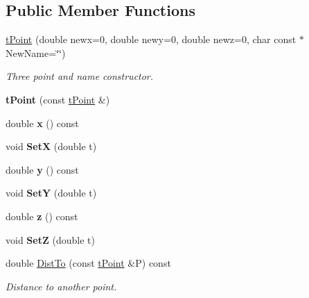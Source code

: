 \subsection*{Public Member Functions}
\begin{DoxyCompactItemize}
\item 
\mbox{\label{classtPoint_a0f7b95c63108ff1996f993f76208e4ee}} 
\hyperlink{classtPoint_a0f7b95c63108ff1996f993f76208e4ee}{t\+Point} (double newx=0, double newy=0, double newz=0, char const $\ast$New\+Name=\char`\"{}\char`\"{})
\begin{DoxyCompactList}\small\item\em Three point and name constructor. \end{DoxyCompactList}\item 
\mbox{\label{classtPoint_acd4d6c37b06415e10f037c29eeeb35d2}} 
{\bfseries t\+Point} (const \hyperlink{classtPoint}{t\+Point} \&)
\item 
\mbox{\label{classtPoint_adfae7cc9253854321270b51acedcbc4d}} 
double {\bfseries x} () const
\item 
\mbox{\label{classtPoint_ae7163ff0afe728da1be12f25844647e1}} 
void {\bfseries SetX} (double t)
\item 
\mbox{\label{classtPoint_a3386f8a21f2f962327ee32b2f77f52ee}} 
double {\bfseries y} () const
\item 
\mbox{\label{classtPoint_ad9fb0cb6d30b24d7478a1d585fe4a491}} 
void {\bfseries SetY} (double t)
\item 
\mbox{\label{classtPoint_a14ad204b83379ad64b0c8ad6af6c4eab}} 
double {\bfseries z} () const
\item 
\mbox{\label{classtPoint_a8da9a00e6d00624721b3dd9bb7a0df79}} 
void {\bfseries SetZ} (double t)
\item 
\mbox{\label{classtPoint_ae712421b8ca24bf96a5516acaf773624}} 
double \hyperlink{classtPoint_ae712421b8ca24bf96a5516acaf773624}{Dist\+To} (const \hyperlink{classtPoint}{t\+Point} \&P) const
\begin{DoxyCompactList}\small\item\em Distance to another point. \end{DoxyCompactList}\item 

\end{DoxyCompactItemize}
